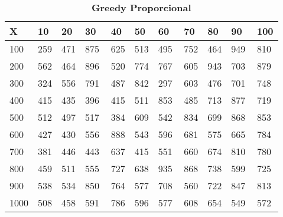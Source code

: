 \documentclass[10pt,letterpaper]{article}
\begin{document}
\begin{center}
\begin{table}\renewcommand{\arraystretch}{2.5}
\caption{\large \textbf{Greedy Proporcional}}
\centering
\begin{tabular} { |m{0.5cm}|m{1.3cm}|m{1.3cm}|m{1.3cm}|m{1.3cm}|m{1.3cm}|m{1.3cm}|m{1.3cm}|m{1.3cm}|m{1.3cm}|m{1.3cm}|} 
\hline
\rowcolor{Gray}
\centering \textbf{X} & \centering \textbf{10} & \centering \textbf{20} & \centering \textbf{30}\ & \centering \textbf{40} & \centering \textbf{50} & \centering \textbf{60}\ & \centering \textbf{70} & \centering \textbf{80} & \centering \textbf{90}\ & \textbf{100} \\\hline
\cellcolor{Gray}100 & \Large 259 & \Large 471 & \Large 875 & \Large 625 & \Large 513 & \Large 495 & \Large 752 & \Large 464 & \Large 949 & \Large 810 \\
\hline
\cellcolor{Gray}200 & \Large 562 & \Large 464 & \Large 896 & \Large 520 & \Large 774 & \Large 767 & \Large 605 & \Large 943 & \Large 703 & \Large 879 \\
\hline
\cellcolor{Gray}300 & \Large 324 & \Large 556 & \Large 791 & \Large 487 & \Large 842 & \Large 297 & \Large 603 & \Large 476 & \Large 701 & \Large 748 \\
\hline
\cellcolor{Gray}400 & \Large 415 & \Large 435 & \Large 396 & \Large 415 & \Large 511 & \Large 853 & \Large 485 & \Large 713 & \Large 877 & \Large 719 \\
\hline
\cellcolor{Gray}500 & \Large 512 & \Large 497 & \Large 517 & \Large 384 & \Large 609 & \Large 542 & \Large 834 & \Large 699 & \Large 868 & \Large 853 \\
\hline
\cellcolor{Gray}600 & \Large 427 & \Large 430 & \Large 556 & \Large 888 & \Large 543 & \Large 596 & \Large 681 & \Large 575 & \Large 665 & \Large 784 \\
\hline
\cellcolor{Gray}700 & \Large 381 & \Large 446 & \Large 443 & \Large 637 & \Large 415 & \Large 551 & \Large 660 & \Large 674 & \Large 810 & \Large 780 \\
\hline
\cellcolor{Gray}800 & \Large 459 & \Large 511 & \Large 555 & \Large 727 & \Large 638 & \Large 935 & \Large 868 & \Large 738 & \Large 599 & \Large 725 \\
\hline
\cellcolor{Gray}900 & \Large 538 & \Large 534 & \Large 850 & \Large 764 & \Large 577 & \Large 708 & \Large 560 & \Large 722 & \Large 847 & \Large 813 \\
\hline
\cellcolor{Gray}1000 & \Large 508 & \Large 458 & \Large 591 & \Large 786 & \Large 596 & \Large 577 & \Large 608 & \Large 654 & \Large 549 & \Large 572 \\
\hline
\end{tabular} \\
\end{table}
\end{center}
\end{document}
